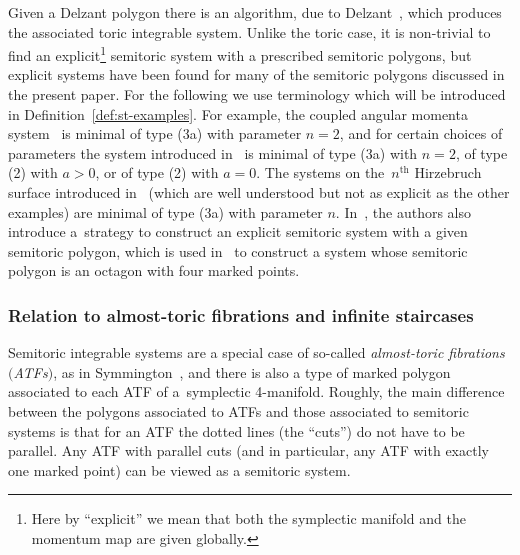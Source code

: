 \documentclass[10pt,a4paper]{amsart}
\numberwithin{equation}{section}
\theoremstyle{definition}
\theoremstyle{plain}
\theoremstyle{plain}
\begin{document}
\begin{Remark}
 Given a Delzant polygon there is an algorithm, due to Delzant~\cite{De1988}, which produces the associated toric integrable system.
 Unlike the toric case, it is non-trivial to find an explicit\footnote{Here by ``explicit'' we mean that both the symplectic manifold and the momentum map are given globally.} semitoric system with a prescribed semitoric polygons, but explicit systems have been found for many of the semitoric polygons discussed in the present paper.
 For the following we use terminology which will be introduced in Definition~\ref{def:st-examples}.
 For example, the coupled angular momenta system~\cite{ADH-momenta,LFP,SaZh1999} is minimal of type (3a) with parameter $n=2$, and for certain choices of parameters the system introduced in~\cite{HoPa2017} is minimal of type (3a) with $n=2$, of type (2) with $a>0$, or of type (2) with $a=0$.
 The systems on the~$n^{\text{th}}$ Hirzebruch surface introduced in~\cite{LFPal} (which are well understood but not as explicit as the other examples) are minimal of type (3a) with parameter $n$. In~\cite{LFPal}, the authors also introduce a~strategy to construct an explicit semitoric system with a given semitoric polygon, which is used in~\cite{HohMeu} to construct a system whose semitoric polygon is an octagon with four marked points.
 \end{Remark}

\subsubsection{Relation to almost-toric fibrations and infinite staircases}
\label{sec:ATFs}

Semitoric integrable systems are a special case of so-called \emph{almost-toric fibrations $($ATFs$)$}, as in Symmington~\cite{Sy2003}, and there is also a type of marked polygon associated to each ATF of a~symplectic 4-manifold.
Roughly, the main difference between the polygons associated to ATFs and those associated to semitoric systems is that for an ATF the dotted lines (the ``cuts'') do not have to be parallel. Any ATF with parallel cuts (and in particular, any ATF with exactly one marked point) can be viewed as a semitoric system.
\end{document}
